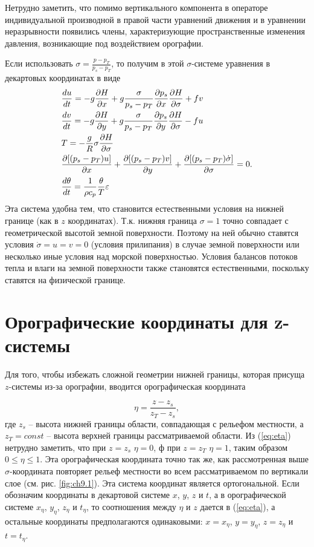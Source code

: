 Нетрудно заметить, что помимо вертикального компонента в операторе индивидуальной производной в правой части уравнений движения и в уравнении неразрывности появились члены, характеризующие пространственные изменения давления, возникающие под воздействием орографии.  

Если использовать $\sigma=\frac{p-p_T}{p_s-p_T}$, то получим в этой $\sigma$-системе уравнения в декартовых координатах в виде
\begin{align}
    \label{eq:dudt2nabla}
    &\displaystyle\frac{d u}{d t} = -g\displaystyle\frac{\partial H}{\partial x}+g\frac{\sigma}{p_s-p_T}\displaystyle\frac{\partial p_s}{\partial x}\displaystyle\frac{\partial H}{\partial \sigma}+fv \\
    \label{eq:dvdt2nabla}
    &\displaystyle\frac{d v}{d t} = -g\displaystyle\frac{\partial H}{\partial y}+g\frac{\sigma}{p_s-p_T}\displaystyle\frac{\partial p_s}{\partial y}\displaystyle\frac{\partial H}{\partial \sigma}-fu \\
    \label{eq:hydrostat2nabla}
    &T=-\frac{g}{R}\sigma\displaystyle\frac{\partial H}{\partial \sigma} \\
    \label{eq:consm2nabla}
    &\displaystyle\frac{\partial [(p_s-p_T)u]}{\partial x} + \displaystyle\frac{\partial [(p_s-p_T)v]}{\partial y} + \displaystyle\frac{\partial [(p_s-p_T)\dot{\sigma}]}{\partial \sigma} = 0. \\
    \label{eq:temp2nabla}
    &\displaystyle\frac{d \theta}{d t}=\frac{1}{\rho c_p}\frac{\theta}{T}\varepsilon 
\end{align}
Эта система удобна тем, что становится естественными условия на нижней границе (как в $z$ координатах). Т.к. нижняя граница $\sigma=1$ точно совпадает с геометрической высотой земной поверхности. Поэтому на ней обычно ставятся условия $\dot{\sigma}=u=v=0$ (условия прилипания) в случае земной поверхности или несколько иные условия над морской поверхностью. Условия балансов потоков тепла и влаги на земной поверхности также становятся естественными, поскольку ставятся на физической границе. 

\section{{\color{done}Орографические координаты для z-системы}}
Для того, чтобы избежать сложной геометрии нижней границы, которая присуща $z$-системы из-за орографии, вводится орографическая координата

\begin{equation}
    \label{eq:eta}
    \eta=\frac{z-z_s}{z_T-z_s}, 
\end{equation}
где $z_s$ -- высота нижней границы области, совпадающая с рельефом местности, а $z_T=const$ -- высота верхней границы рассматриваемой области. Из (\ref{eq:eta}) нетрудно заметить, что при $z=z_s$ $\eta=0$, ф при $z=z_T$ $\eta=1$, таким образом $0\leq\eta\leq1$. Эта орографическая координата точно так же, как рассмотренная выше $\sigma$-координата повторяет рельеф местности во всем рассматриваемом по вертикали слое (см. рис. \ref{fig:ch9.1}). Эта система координат является ортогональной. Если обозначим координаты в декартовой системе $x$, $y$, $z$ и $t$, а в орографической системе $x_{\eta}$, $y_{\eta}$, $z_{\eta}$ и $t_{\eta}$, то соотношения между $\eta$ и $z$ дается в (\ref{eq:eta}), а остальные координаты предполагаются одинаковыми: $x=x_{\eta}$, $y=y_{\eta}$, $z=z_{\eta}$ и $t=t_{\eta}$. 

